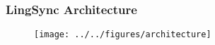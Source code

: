 \documentclass{beamer}
\begin{document}
\begin{frame}
\frametitle{LingSync Architecture}
\begin{figure}
\begin{center}
\texttt{[image: ../../figures/architecture]}
\label{lingsync:architecture}
\end{center}
\end{figure}

%
%

\end{frame}
\end{document}
